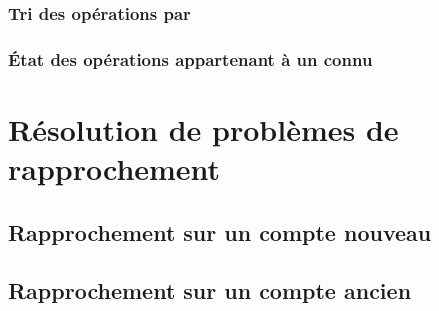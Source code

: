\subsubsection{Tri des opérations par \label{reconciliation-manage-content-sort}}



\subsubsection{État des opérations appartenant à un  connu\label{reconciliation-manage-content-report}}


\section{Résolution de problèmes de rapprochement\label{reconciliation-solve}}


\subsection{Rapprochement sur un compte nouveau\label{reconciliation-solve-new}}

\subsection{Rapprochement sur un compte ancien\label{reconciliation-solve-old}}



